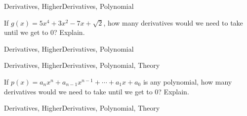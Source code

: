 
\begin{tagblock}{Derivatives, HigherDerivatives, Polynomial}
\begin{question}
	




If $g(x) = 5x^4 + 3x^2 - 7x + \sqrt{2}$, how many derivatives would we need to take until we get to $0$? Explain. 











	
	
\begin{tags}
	    Derivatives, HigherDerivatives, Polynomial
\end{tags}
	
\begin{diary}
\end{diary}
	
\begin{solution}
	   
\end{solution}
	
\end{question}

\end{tagblock}


\begin{tagblock}{Derivatives, HigherDerivatives, Polynomial, Theory}
\begin{question}
	




If $p(x) = a_nx^n + a_{n-1}x^{n-1} + \cdots + a_1x + a_0$ is any polynomial, how many derivatives would we need to take until we get to $0$?  Explain.











	
	
\begin{tags}
	    Derivatives, HigherDerivatives, Polynomial, Theory
\end{tags}
	
\begin{diary}
\end{diary}
	
\begin{solution}
	   
\end{solution}
	
\end{question}

\end{tagblock}

